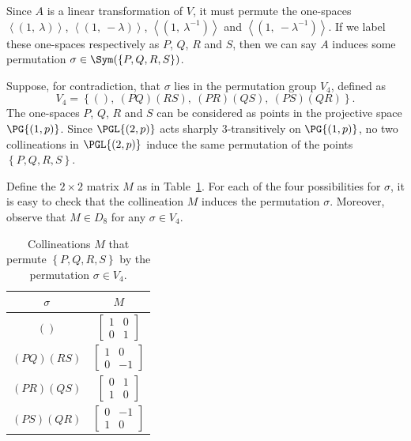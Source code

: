Since $A$ is a linear transformation of $V$, it must permute the one-spaces $\left<\left(1,\ \lambda \right)\right>$, $\left<\left(1,\ -\lambda \right)\right>$, $\left<\left(1,\ \lambda^{-1} \right)\right>$ and $\left<\left(1,\ -\lambda^{-1} \right)\right>$. If we label these one-spaces respectively as $P$, $Q$, $R$ and $S$, then we can say $A$ induces some permutation $\sigma \in \Sym(\left\{P, Q, R, S \right\})$.

Suppose, for contradiction, that $\sigma$ lies in the permutation group $V_4$, defined as
\begin{displaymath}
V_4 = {\left\{(),\ {\left(PQ \right)}{\left(RS \right)},\ {\left(PR \right)}{\left(QS \right)},\ {\left(PS \right)}{\left(QR \right)} \right\}}.
\end{displaymath}
The one-spaces $P$, $Q$, $R$ and $S$ can be considered as points in the projective space $\PG{\left(1, p \right)}$. Since $\PGL{\left(2, p \right)}$ acts sharply $3$-transitively on $\PG{\left(1, p \right)}$, no two collineations in $\PGL{\left(2, p \right)}$ induce the same permutation of the points $\left\{P, Q, R, S \right\}$.

Define the $2 \times 2$ matrix $M$ as in Table~\ref{tbl:V_4-collineations}. For each of the four possibilities for $\sigma$, it is easy to check that the collineation $M$ induces the permutation $\sigma$. Moreover, observe that $M \in D_8$ for any $\sigma \in V_4$.

\begin{table}
\centering
\begin{tabular}{cc}
\hline
$\sigma$ & $M$ \\
\hline
\vphantom{\Bigg(}$()$ & $\begin{bmatrix} 1 & 0 \\ 0 & 1 \end{bmatrix}$ \\
\vphantom{\Bigg(}${\left(PQ \right)}{\left(RS \right)}$ & $\begin{bmatrix} 1 & 0 \\ 0 & -1 \end{bmatrix}$ \\
\vphantom{\Bigg(}${\left(PR \right)}{\left(QS \right)}$ & $\begin{bmatrix} 0 & 1 \\ 1 & 0 \end{bmatrix}$ \\
\vphantom{\Bigg(}${\left(PS \right)}{\left(QR \right)}$ & $\begin{bmatrix} 0 & -1 \\ 1 & 0 \end{bmatrix}$ \\
\hline
\end{tabular}
\caption{Collineations $M$ that permute $\left\{P, Q, R, S \right\}$ by the permutation $\sigma \in V_4$.}
\label{tbl:V_4-collineations}
\end{table}


